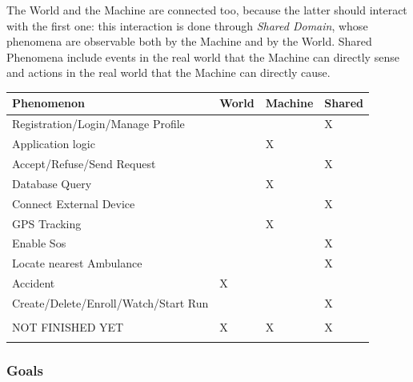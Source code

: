 \documentclass[a4paper]{article}
\begin{document}
        The World and the Machine are connected too, because the latter should interact with the first one: this interaction is done through \textit{Shared Domain}, whose phenomena are observable both by the Machine and by the World. Shared Phenomena include events in the real world that the Machine can directly sense and actions in the real world that the Machine can directly cause.
        \newpage
        \begin{table}[!htpb]
        \centering
        \begin{tabular}{|l|l|l|l|}
        \hline
         \textbf{Phenomenon} & \textbf{World} & \textbf{Machine} & \textbf{Shared}\\ \hline
         Registration/Login/Manage Profile & & & X \\ \hline
         Application logic & & X & \\ \hline
         Accept/Refuse/Send Request & & & X \\ \hline
         Database Query & & X & \\ \hline
         Connect External Device & & & X \\ \hline
         GPS Tracking & & X & \\ \hline
         Enable Sos & & & X \\ \hline
         Locate nearest Ambulance & & & X \\ \hline
         Accident & X & & \\ \hline
         Create/Delete/Enroll/Watch/Start Run & & & X \\ \hline
         & & & \\ \hline
         NOT FINISHED YET & X & X & X \\ \hline
         & & & \\ \hline
        \end{tabular}
        \end{table}
        
        \subsubsection{Goals}
        
\end{document}
